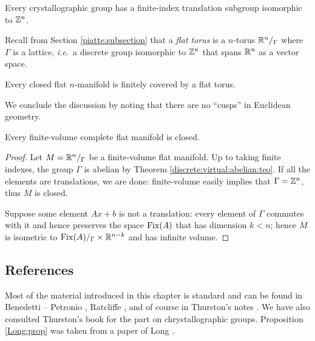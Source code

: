 \begin{cor} \label{crystal:cor}
Every crystallographic group has a finite-index translation subgroup isomorphic to $\mathbb{Z}^n$.
\end{cor}

Recall from Section \ref{piatte:subsection} that a \emph{flat torus} is a $n$-torus $\mathbb{R}^n/_\Gamma$ where $\Gamma$ is a lattice, \emph{i.e.}~a discrete group isomorphic to $\mathbb{Z}^n$ that spans $\mathbb{R}^n$ as a vector space.

\begin{cor} \label{Bieberbach:cor}
Every closed flat $n$-manifold is finitely covered by a flat torus.
\end{cor}

We conclude the discussion by noting that there are no ``cusps'' in Euclidean geometry.

\begin{prop} \label{finite:volume:flat:prop}
Every finite-volume complete flat manifold is closed.
\end{prop}
\begin{proof}
Let $M=\mathbb{R}^n/_\Gamma$ be a finite-volume flat manifold. Up to taking finite indexes, the group $\Gamma$ is abelian by Theorem \ref{discrete:virtual:abelian:teo}. If all the elements are translations, we are done: finite-volume easily implies that $\Gamma = \mathbb{Z}^n$, thus $M$ is closed. 

Suppose some element $Ax + b$ is not a translation: every element of $\Gamma$ commutes with it and hence preserves the space ${\rm Fix} (A)$ that has dimension $k<n$; hence $M$ is isometric to ${\rm Fix} (A)/_\Gamma \times \mathbb{R}^{n-k}$ and has infinite volume.
\end{proof}

\subsection{References}
Most of the material introduced in this chapter is standard and can be found in Benedetti -- Petronio \cite{BP}, Ratcliffe \cite{R}, and of course in Thurston's notes \cite{Th}. We have also consulted Thurston's book \cite{Th_book} for the part on chrystallographic groups. Proposition \ref{Long:prop} was taken from a paper of Long \cite{L}.


